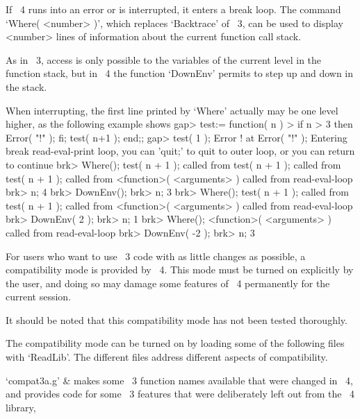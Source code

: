 If {\GAP}~4 runs into an error or is interrupted,
it enters a break loop.
The command `Where( <number> )', which replaces `Backtrace' of {\GAP}~3,
can be used to display <number> lines of information about the current
function call stack.

As in {\GAP}~3, access is only possible to the variables of the current
level in the function stack,
but in {\GAP}~4 the function `DownEnv' permits to step up and down in the
stack.

When interrupting, the first line printed by `Where' actually may be
one level higher, as the following example shows
\begintt
    gap> test:= function( n )
    >    if n > 3 then Error( "!" ); fi; test( n+1 ); end;;
    gap> test( 1 );
    Error ! at
    Error( "!" );
    Entering break read-eval-print loop,
    you can 'quit;' to quit to outer loop,
    or you can return to continue
    brk> Where();
    test( n + 1 ); called from
    test( n + 1 ); called from
    test( n + 1 ); called from
    <function>( <arguments> ) called from read-eval-loop
    brk> n;
    4
    brk> DownEnv();
    brk> n;
    3
    brk> Where();
    test( n + 1 ); called from
    test( n + 1 ); called from
    <function>( <arguments> ) called from read-eval-loop
    brk> DownEnv( 2 );
    brk> n;
    1
    brk> Where();
    <function>( <arguments> ) called from read-eval-loop
    brk> DownEnv( -2 );
    brk> n;
    3
\endtt




For users who want to use {\GAP}~3 code with as little changes as
possible, a compatibility mode is provided by {\GAP}~4.
This mode must be turned on explicitly by the user,
and doing so may damage some features of {\GAP}~4 permanently
for the current session.

It should be noted that this compatibility mode has not been tested
thoroughly.

The compatibility mode can be turned on by loading some of the following
files with `ReadLib'.
The different files address different aspects of compatibility.

\beginitems
`compat3a.g' &
    makes some {\GAP}~3 function names available that were changed
    in {\GAP}~4,
    and provides code for some {\GAP}~3 features that were
    deliberately left out from the {\GAP}~4 library,

